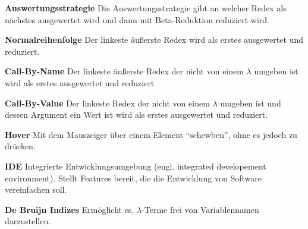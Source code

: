 \documentclass[parskip=full,11pt,twoside]{scrartcl}
\begin{document}
\textbf{Auswertungsstrategie}
Die Auswertungsstrategie gibt an welcher Redex als nächstes ausgewertet wird und dann mit Beta-Reduktion reduziert wird.

\textbf{Normalreihenfolge}
Der linkeste äußerste Redex wird als erstes ausgewertet und reduziert.

\textbf{Call-By-Name}
Der linkeste äußerste Redex der nicht von einem $\lambda$ umgeben ist wird als erstes ausgewertet und reduziert

\textbf{Call-By-Value}
Der linkeste Redex der nicht von einem $\lambda$ umgeben ist und dessen Argument ein Wert ist wird als erstes ausgewertet und reduziert.

\textbf{Hover}
Mit dem Mauszeiger über einem Element \enquote{schewben}, ohne es jedoch zu drücken.

\textbf{IDE}
Integrierte Entwicklungsumgebung (engl. integrated developement environment). Stellt Features bereit, die die Entwicklung von Software vereinfachen soll.

\textbf{De Bruijn Indizes}
Ermöglicht es, $\lambda$-Terme frei von Variablennamen darzustellen.
 
\end{document}
